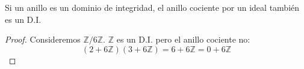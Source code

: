 \begin{ce}
    Si un anillo es un dominio de integridad, el anillo cociente por un ideal también es un D.I.
\end{ce}

\begin{proof}
    Consideremos $\mathbb{Z} / 6\mathbb{Z}$. $\mathbb{Z}$ es un D.I. pero el anillo cociente no:
    \begin{equation}
        (2 + 6\mathbb{Z}) (3 + 6\mathbb{Z}) = 6 + 6\mathbb{Z} = 0 + 6\mathbb{Z}
    \end{equation}
\end{proof}

